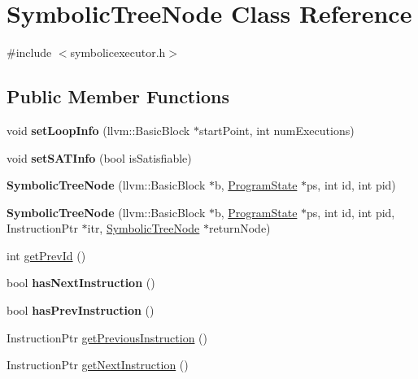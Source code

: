 \hypertarget{classSymbolicTreeNode}{}\section{Symbolic\+Tree\+Node Class Reference}
\label{classSymbolicTreeNode}


{\ttfamily \#include $<$symbolicexecutor.\+h$>$}

\subsection*{Public Member Functions}
\begin{DoxyCompactItemize}
\item 
void {\bfseries set\+Loop\+Info} (llvm\+::\+Basic\+Block $\ast$start\+Point, int num\+Executions)\hypertarget{classSymbolicTreeNode_aa9fa7897b90dcd9952f073c74bee0dcd}{}\label{classSymbolicTreeNode_aa9fa7897b90dcd9952f073c74bee0dcd}

\item 
void {\bfseries set\+S\+A\+T\+Info} (bool is\+Satisfiable)\hypertarget{classSymbolicTreeNode_aa65962edc535d1b708d1a58a3d92e0f2}{}\label{classSymbolicTreeNode_aa65962edc535d1b708d1a58a3d92e0f2}

\item 
{\bfseries Symbolic\+Tree\+Node} (llvm\+::\+Basic\+Block $\ast$b, \hyperlink{classProgramState}{Program\+State} $\ast$ps, int id, int pid)\hypertarget{classSymbolicTreeNode_afe9df25cbc52a55e7831966ddbd0fada}{}\label{classSymbolicTreeNode_afe9df25cbc52a55e7831966ddbd0fada}

\item 
{\bfseries Symbolic\+Tree\+Node} (llvm\+::\+Basic\+Block $\ast$b, \hyperlink{classProgramState}{Program\+State} $\ast$ps, int id, int pid, Instruction\+Ptr $\ast$itr, \hyperlink{classSymbolicTreeNode}{Symbolic\+Tree\+Node} $\ast$return\+Node)\hypertarget{classSymbolicTreeNode_a7978a78716a205260862307289243228}{}\label{classSymbolicTreeNode_a7978a78716a205260862307289243228}

\item 
int \hyperlink{classSymbolicTreeNode_a0e2230ae842dd4fa496ef43bfe41fbe6}{get\+Prev\+Id} ()
\item 
bool {\bfseries has\+Next\+Instruction} ()\hypertarget{classSymbolicTreeNode_a366cbce6fb36aa4e8f196a82e2122c53}{}\label{classSymbolicTreeNode_a366cbce6fb36aa4e8f196a82e2122c53}

\item 
bool {\bfseries has\+Prev\+Instruction} ()\hypertarget{classSymbolicTreeNode_a7d66a26cd3233b8a1deee0c54817191b}{}\label{classSymbolicTreeNode_a7d66a26cd3233b8a1deee0c54817191b}

\item 
Instruction\+Ptr \hyperlink{classSymbolicTreeNode_a7186f53898aa5617d2ebd2490357954b}{get\+Previous\+Instruction} ()
\item 
Instruction\+Ptr \hyperlink{classSymbolicTreeNode_a500cfa6b978cc71bcfdee22aec244941}{get\+Next\+Instruction} ()
\end{DoxyCompactItemize}
